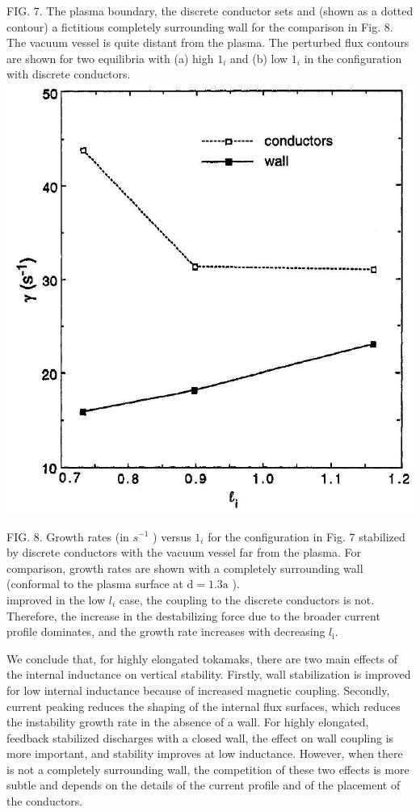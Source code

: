 \documentclass[10pt]{article}
\begin{document}
FIG. 7. The plasma boundary, the discrete conductor sets and (shown as a dotted contour) a fictitious completely surrounding wall for the comparison in Fig. 8. The vacuum vessel is quite distant from the plasma. The perturbed flux contours are shown for two equilibria with (a) high $1_{i}$ and (b) low $1_{i}$ in the configuration with discrete conductors.\\
\includegraphics[max width=\textwidth, center]{2025_01_10_a0135324997886412d98g-8}

FIG. 8. Growth rates (in $s^{-1}$ ) versus $1_{i}$ for the configuration in Fig. 7 stabilized by discrete conductors with the vacuum vessel far from the plasma. For comparison, growth rates are shown with a completely surrounding wall (conformal to the plasma surface at $\mathrm{d}=1.3 \mathrm{a}$ ).\\
improved in the low $l_{i}$ case, the coupling to the discrete conductors is not. Therefore, the increase in the destabilizing force due to the broader current profile dominates, and the growth rate increases with decreasing $l_{\mathrm{i}}$.

We conclude that, for highly elongated tokamaks, there are two main effects of the internal inductance on vertical stability. Firstly, wall stabilization is improved for low internal inductance because of increased magnetic coupling. Secondly, current peaking reduces the shaping of the internal flux surfaces, which reduces the instability growth rate in the absence of a wall. For highly elongated, feedback stabilized discharges with a closed wall, the effect on wall coupling is more important, and stability improves at low inductance. However, when there is not a completely surrounding wall, the competition of these two effects is more subtle and depends on the details of the current profile and of the placement of the conductors.
\end{document}
